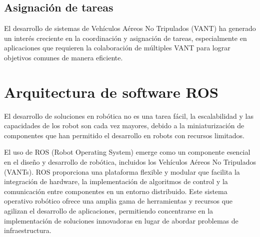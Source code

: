 \subsection{Asignación de tareas}

El desarrollo de sistemas de Vehículos Aéreos No Tripulados (VANT) ha generado un interés creciente en la coordinación y asignación de tareas, especialmente en aplicaciones que requieren la colaboración de múltiples VANT para lograr objetivos comunes de manera eficiente.


\section{Arquitectura de software ROS}

El desarrollo de soluciones en robótica no es una tarea fácil, la escalabilidad y las capacidades de los robot son cada vez mayores, debido a la miniaturización de componentes que han permitido el desarrollo en robots con recursos limitados.

El uso de ROS (Robot Operating System) emerge como un componente esencial en el diseño y desarrollo de robótica, incluidos los Vehículos Aéreos No Tripulados (VANTs). ROS proporciona una plataforma flexible y modular que facilita la integración de hardware, la implementación de algoritmos de control y la comunicación entre componentes en un entorno distribuido. Este sistema operativo robótico ofrece una amplia gama de herramientas y recursos que agilizan el desarrollo de aplicaciones, permitiendo concentrarse en la implementación de soluciones innovadoras en lugar de abordar problemas de infraestructura.

